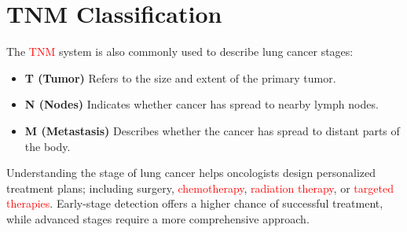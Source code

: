 \section{TNM Classification} 
The \textcolor{red}{TNM} system is also commonly used to describe lung cancer stages:
\begin{itemize}
    \item \textbf{T (Tumor)}  Refers to the size and extent of the primary tumor.
    \item \textbf{N (Nodes)} Indicates whether cancer has spread to nearby lymph nodes.
    \item \textbf{M (Metastasis)} Describes whether the cancer has spread to distant parts of the body.
\end{itemize}

Understanding the stage of lung cancer helps oncologists design personalized treatment plans; including surgery, \textcolor{red}{chemotherapy}, \textcolor{red}{radiation therapy}, or \textcolor{red}{targeted therapies}. Early-stage detection offers a higher chance of successful treatment, while advanced stages require a more comprehensive approach.
